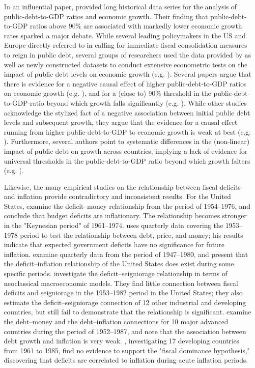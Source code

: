 \documentclass[12pt, titlepage]{article}
\numberwithin{equation}{section}
\begin{document}
	In an influential paper, \cite{Reinhart2010} provided long historical data series for the analysis of public-debt-to-GDP ratios and economic growth. Their finding that public-debt-to-GDP ratios above 90\% are associated with markedly lower economic growth rates sparked a major debate. While several leading policymakers in the US and Europe directly referred to \cite{Reinhart2010} in calling for immediate fiscal consolidation measures to reign in public debt, several groups of researchers used the data provided by \cite{Reinhart2010} as well as newly constructed datasets to conduct extensive econometric tests on the impact of public debt levels on economic growth (e.g. \cite{Herndon2014, Woo2015}).  Several papers argue that there is evidence for a negative causal effect of higher public-debt-to-GDP ratios on economic growth (e.g. \cite{Woo2015, Chudik2017}), and for a (close to) 90\% threshold in the public-debt-to-GDP-ratio beyond which growth falls significantly (e.g. \cite{Checherita2012, Baum2013}). While other studies acknowledge the stylized fact of a negative association between initial public debt levels and subsequent growth, they argue that the evidence for a causal effect running from higher public-debt-to-GDP to economic growth is weak at best (e.g. \cite{Panizza2014}). Furthermore, several authors point to systematic differences in the (non-linear) impact of public debt on growth across countries, implying a lack of evidence for universal thresholds in the public-debt-to-GDP ratio beyond which growth falters (e.g. \cite{Eberhardt2015, Eberhardt_2019, Bentour2021}).

	Likewise, the many empirical studies on the relationship between fiscal deficits and inflation provide contradictory and inconsistent results. For the United States, \cite{Hamburger1981} examine the deficit–money relationship from the period of 1954–1976, and conclude that budget deficits are inflationary. The relationship becomes stronger in the "Keynesian period" of 1961--1974. \cite{Dwyer82} uses quarterly data covering the 1953--1978 period to test the relationship between debt, price, and money; his results indicate that expected government deficits have no significance for future inflation. \cite{Ahking85}  examine quarterly data from the period of 1947–1980, and present that the deficit–inflation relationship of the United States does exist during some specific periods. \cite{King1985} investigate the deficit–seigniorage relationship in terms of neoclassical macroeconomic models. They find little connection between fiscal deficits and seigniorage in the 1953–1982 period in the United States; they also estimate the deficit–seigniorage connection of 12 other industrial and developing countries, but still fail to demonstrate that the relationship is significant. \cite{Protopapadakis87} examine the debt–money and the debt–inflation connections for 10 major advanced countries during the period of 1952–1987, and note that the association between debt growth and inflation is very weak. \cite{Haan1990}, investigating 17 developing countries from 1961 to 1985, find no evidence to support the "fiscal dominance hypothesis," discovering that deficits are correlated to inflation during acute inflation periods.
\end{document}
